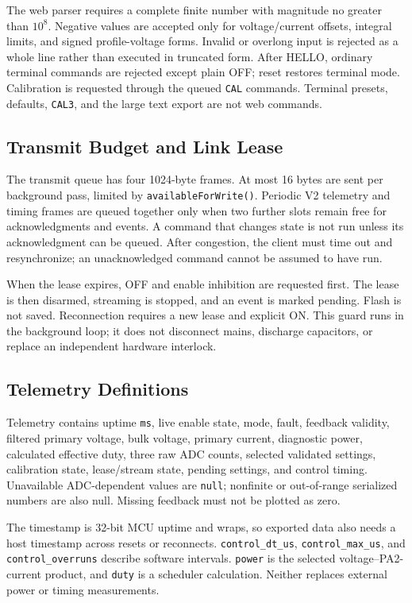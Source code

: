 The web parser requires a complete finite number with magnitude no greater than \(10^8\). Negative values are accepted only for voltage/current offsets, integral limits, and signed profile-voltage forms. Invalid or overlong input is rejected as a whole line rather than executed in truncated form. After HELLO, ordinary terminal commands are rejected except plain OFF; reset restores terminal mode. Calibration is requested through the queued \texttt{CAL} commands. Terminal presets, defaults, \texttt{CAL3}, and the large text export are not web commands.

\subsection{Transmit Budget and Link Lease}

The transmit queue has four 1024-byte frames. At most 16 bytes are sent per background pass, limited by \texttt{availableForWrite()}. Periodic V2 telemetry and timing frames are queued together only when two further slots remain free for acknowledgments and events. A command that changes state is not run unless its acknowledgment can be queued. After congestion, the client must time out and resynchronize; an unacknowledged command cannot be assumed to have run.

When the lease expires, OFF and enable inhibition are requested first. The lease is then disarmed, streaming is stopped, and an event is marked pending. Flash is not saved. Reconnection requires a new lease and explicit ON. This guard runs in the background loop; it does not disconnect mains, discharge capacitors, or replace an independent hardware interlock.

\subsection{Telemetry Definitions}

Telemetry contains uptime \texttt{ms}, live enable state, mode, fault, feedback validity, filtered primary voltage, bulk voltage, primary current, diagnostic power, calculated effective duty, three raw ADC counts, selected validated settings, calibration state, lease/stream state, pending settings, and control timing. Unavailable ADC-dependent values are \texttt{null}; nonfinite or out-of-range serialized numbers are also null. Missing feedback must not be plotted as zero.

The timestamp is 32-bit MCU uptime and wraps, so exported data also needs a host timestamp across resets or reconnects. \texttt{control\_dt\_us}, \texttt{control\_max\_us}, and \texttt{control\_overruns} describe software intervals. \texttt{power} is the selected voltage--PA2-current product, and \texttt{duty} is a scheduler calculation. Neither replaces external power or timing measurements.

